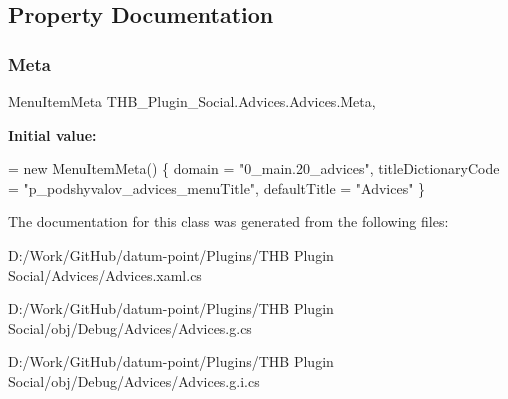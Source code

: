 \subsection{Property Documentation}
\mbox{\label{class_t_h_b___plugin___social_1_1_advices_1_1_advices_a3bf255584096fb4a8f5ec2d7d5048c4c}} 
\subsubsection{\texorpdfstring{Meta}{Meta}}
{\footnotesize\ttfamily Menu\+Item\+Meta T\+H\+B\+\_\+\+Plugin\+\_\+\+Social.\+Advices.\+Advices.\+Meta\hspace{0.3cm}{\ttfamily [get]}, {\ttfamily [set]}}

{\bfseries Initial value\+:}
\begin{DoxyCode}
= \textcolor{keyword}{new} MenuItemMeta()
        \{
            domain = \textcolor{stringliteral}{"0\_main.20\_advices"},
            titleDictionaryCode = \textcolor{stringliteral}{"p\_podshyvalov\_advices\_menuTitle"},
            defaultTitle = \textcolor{stringliteral}{"Advices"}
        \}
\end{DoxyCode}


The documentation for this class was generated from the following files\+:\begin{DoxyCompactItemize}
\item 
D\+:/\+Work/\+Git\+Hub/datum-\/point/\+Plugins/\+T\+H\+B Plugin Social/\+Advices/Advices.\+xaml.\+cs\item 
D\+:/\+Work/\+Git\+Hub/datum-\/point/\+Plugins/\+T\+H\+B Plugin Social/obj/\+Debug/\+Advices/Advices.\+g.\+cs\item 
D\+:/\+Work/\+Git\+Hub/datum-\/point/\+Plugins/\+T\+H\+B Plugin Social/obj/\+Debug/\+Advices/Advices.\+g.\+i.\+cs\end{DoxyCompactItemize}
